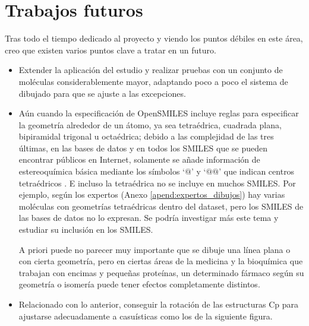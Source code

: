 \section{Trabajos futuros}

Tras todo el tiempo dedicado al proyecto y viendo los puntos débiles en este área, creo que existen varios puntos clave a tratar en un futuro. 

\begin{itemize}
    \item Extender la aplicación del estudio y realizar pruebas con un conjunto de moléculas considerablemente mayor, adaptando poco a poco el sistema de dibujado para que se ajuste a las excepciones.
    
    \item Aún cuando la especificación de OpenSMILES incluye reglas para especificar la geometría alrededor de un átomo, ya sea tetraédrica, cuadrada plana, bipiramidal trigonal u octaédrica; debido a las complejidad de las tres últimas, en las bases de datos y en todos los SMILES que se pueden encontrar públicos en Internet, solamente se añade información de estereoquímica básica mediante los símbolos `$@$' y `$@@$' que indican centros tetraédricos \cite{opensmiles, crystallography_quiros}. E incluso la tetraédrica no se incluye en muchos SMILES. Por ejemplo, según los expertos (Anexo \ref{apend:expertos_dibujos}) hay varias moléculas con geometrías tetraédricas dentro del dataset, pero los SMILES de las bases de datos no lo expresan. Se podría investigar más este tema y estudiar su inclusión en los SMILES.
    
    A priori puede no parecer muy importante que se dibuje una línea plana o con cierta geometría, pero en ciertas áreas de la medicina y la bioquímica que trabajan con encimas y pequeñas proteínas, un determinado fármaco según su geometría o isomería puede tener efectos completamente distintos.
    
    \item Relacionado con lo anterior, conseguir la rotación de las estructuras Cp para ajustarse adecuadamente a casuísticas como los de la siguiente figura. 
    

\end{itemize}
